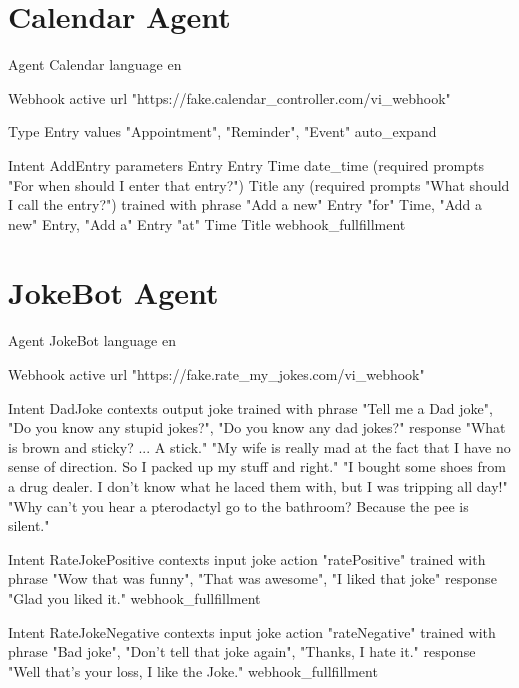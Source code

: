 \section{Calendar Agent}
\label{Calendar Agent DSL}

\begin{DSL}
Agent Calendar
  language en

  Webhook
    active
    url "https://fake.calendar_controller.com/vi_webhook"
  
  Type Entry
    values 
      "Appointment", 
      "Reminder", 
      "Event"
    auto_expand
  
  Intent AddEntry
    parameters 
      Entry Entry
      Time date_time (required prompts "For when should I
        enter that entry?")
      Title any (required prompts "What should I call the entry?")
    trained with phrase
      "Add a new" Entry "for" Time,
      "Add a new" Entry,
      "Add a" Entry "at" Time Title
    webhook_fullfillment
\end{DSL}
\pagebreak


\section{JokeBot Agent}
\label{JokeBot Agent DSL}

\begin{DSL}
Agent JokeBot
  language en
  
  Webhook
    active
    url "https://fake.rate_my_jokes.com/vi_webhook"
  
  Intent DadJoke
    contexts 
      output joke 
    trained with phrase
      "Tell me a Dad joke",
      "Do you know any stupid jokes?",
      "Do you know any dad jokes?"
    response 
      "What is brown and sticky? ... A stick."
      "My wife is really mad at the fact that I have no
        sense of direction. So I packed up my stuff and right."
      "I bought some shoes from a drug dealer. I don't know what
        he laced them with, but I was tripping all day!"
      "Why can't you hear a pterodactyl go to the bathroom?
        Because the pee is silent."
  
  Intent RateJokePositive
    contexts 
      input joke
    action "ratePositive"
    trained with phrase
      "Wow that was funny",
      "That was awesome",
      "I liked that joke"
    response
      "Glad you liked it."
    webhook_fullfillment
  
  Intent RateJokeNegative
    contexts 
      input joke
    action "rateNegative"
    trained with phrase
      "Bad joke",
      "Don't tell that joke again",
      "Thanks, I hate it."
    response
      "Well that's your loss, I like the Joke."
    webhook_fullfillment
\end{DSL}
\pagebreak


